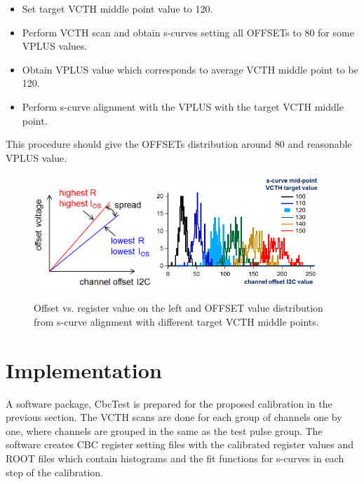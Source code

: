 \documentclass[11pt,a4paper]{article}
\begin{document}
	\begin{itemize}
	\item Set target VCTH middle point value to 120.
	\item Perform VCTH scan and obtain s-curves setting all OFFSETs to 80 for some VPLUS values.
	\item Obtain VPLUS value which corresponds to average VCTH middle point to be 120. 
	\item Perform s-curve alignment with the VPLUS with the target VCTH middle point.
	\end{itemize}

	This procedure should give the OFFSETs distribution around 80 and reasonable VPLUS value.

	\begin{figure}[htbp]
	\centering
	\includegraphics[width=0.4\textwidth]{fig/OffsetI2c.png}
	\includegraphics[width=0.55\textwidth]{fig/VcthMidI2c.png}
	\caption{Offset vs. register value on the left and OFFSET value distribution from s-curve alignment with different target VCTH middle points. }\label{fig:offset-i2c}
	\end{figure}

	\section{Implementation}\label{ch:implementation}
	A software package, CbcTest is prepared for the proposed calibration in the previous section.
	The VCTH scans are done for each group of channels one by one, where channels are grouped in the same as the test pulse group.
	The software creates CBC register setting files with the calibrated register values and ROOT files which contain histograms 
	and the fit functions for s-curves in each step of the calibration.
\end{document}
